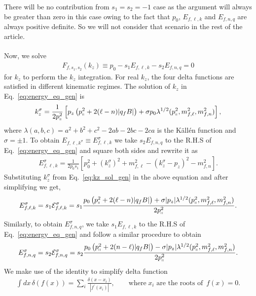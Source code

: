 \documentclass[aps,prd,floatfix,showpacs,showkeys,superscriptadress,unsortedaddress,nofootinbib,onecolumn]{revtex4-1}
\newcommand{\shp}{\shortparallel}
\begin{document}
There will be no contribution from $s_1=s_2=-1$ case as the argument will always be greater than zero in this case owing to the fact that $p_0$, $E_{f,\ell,k}$ and $E_{f,n,q}$ are always positive definite. So we will not consider that scenario in the rest of the article.\\ \\
Now, we solve 
\begin{align}
F_{f,s_1,s_2}(k_z)\equiv p_0 -s_1E_{f,\ell,k}-s_2E_{f,n,q} = 0 \label{eq:energy_eq_gen}
\end{align}
for $k_z$ to perform the $k_z$ integration. For real $k_z$, the four delta functions are satisfied in different kinematic regimes. The solution of $k_z$ in Eq.~\eqref{eq:energy_eq_gen} is 
\begin{align}
k_{z}^{\sigma} = \frac{1}{2p_{\shp}^2}\left[p_z\left(p_{\shp}^2+2 (\ell-n)|q_fB|\right)+\sigma p_0\lambda^{1/2}(p_{\shp}^2,m_{f,\ell}^2,m_{f,n}^2)\right], \label{eq:kz_sol_gen}
\end{align}
where $\lambda(a,b,c)=a^2+b^2+c^2-2ab-2bc-2ca$ is the K{\" a}ll{\' e}n function and $\sigma=\pm 1$. To obtain $E_{f,\ell,k^{\sigma}}\equiv E^{\sigma}_{f,\ell,k}$ we take $s_2E_{f,n,q}$ to the R.H.S of Eq.~\eqref{eq:energy_eq_gen} and square both sides and rewrite it as
\begin{align}
E^{\sigma}_{f,\ell,k} = \frac{1}{2p_0s_1}\left[p_0^2+(k_z^{\sigma})^2+m_{f,\ell}^2-(k_z^{\sigma}-p_z)^2-m_{f,n}^2\right].
\end{align}   Substituting $k_z^{\sigma}$ from Eq.~\eqref{eq:kz_sol_gen} in the above equation and after simplifying we get,
\begin{align}
E^{\sigma}_{f,\ell,k} = s_1\mathcal{E}^{\sigma}_{f,\ell,k} = s_1\frac{p_0\left(p_{\shp}^2+2 (\ell-n)|q_fB|\right)+\sigma |p_z|\lambda^{1/2}(p_{\shp}^2,m_{f,\ell}^2,m_{f,n}^2)}{2p_{\shp}^2}.
\end{align}
Similarly, to obtain $E^{\sigma}_{f,n,q}$, we take $s_1E_{f,\ell,k}$ to the R.H.S of Eq.~\eqref{eq:energy_eq_gen} and follow a similar procedure to obtain
\begin{align}
E^{\sigma}_{f,n,q} = s_2\mathcal{E}^{\sigma}_{f,n,q} = s_2\frac{p_0\left(p_{\shp}^2+2 (n-\ell)|q_fB|\right)-\sigma |p_z|\lambda^{1/2}(p_{\shp}^2,m_{f,\ell}^2,m_{f,n}^2)}{2p_{\shp}^2}.
\end{align}  
We make use of the identity to simplify delta function
\begin{align}
\int dx\,\delta(f(x)) = \sum_{i}\frac{\delta(x-x_i)}{|f^{\prime}(x_i)|},\qquad \text{where}\; x_i\,\,\text{are the roots of }\,f(x)=0. \label{eq:Fs1s2}
\end{align}
\end{document}
